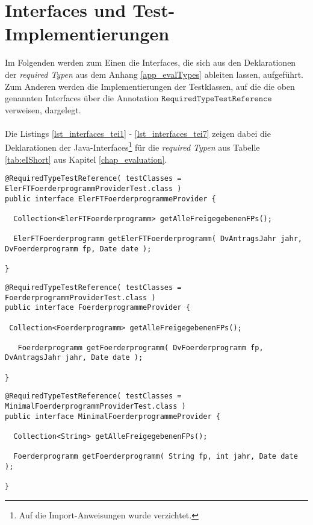 \chapter{Interfaces und Test-Implementierungen}\label{app_interfacesAndTests}
Im Folgenden werden zum Einen die Interfaces, die sich aus den Deklarationen der \emph{required Typen} aus dem Anhang \ref{app_evalTypes} ableiten lassen, aufgeführt. Zum Anderen werden die Implementierungen der Testklassen, auf die die oben genannten Interfaces über die Annotation $\texttt{RequiredTypeTestReference}$ verweisen, dargelegt. 
\\\\
Die Listings \ref{lst_interfaces_tei1} - \ref{lst_interfaces_tei7} zeigen dabei die Deklarationen der Java-Interfaces\footnote{Auf die Import-Anweisungen wurde verzichtet.} für die \emph{required Typen} aus Tabelle \ref{tab:eIShort} aus Kapitel \ref{chap_evaluation}.
\begin{lstlisting}[style = java, caption = Interface ElerFTFoerderprogrammeProvider, captionpos = b, label = lst_interfaces_tei1]
@RequiredTypeTestReference( testClasses = ElerFTFoerderprogrammProviderTest.class )
public interface ElerFTFoerderprogrammeProvider {

  Collection<ElerFTFoerderprogramm> getAlleFreigegebenenFPs();

  ElerFTFoerderprogramm getElerFTFoerderprogramm( DvAntragsJahr jahr, DvFoerderprogramm fp, Date date );
  
}
\end{lstlisting}
\begin{lstlisting}[style = java, caption = Interface FoerderprogrammeProvider, captionpos = b, label = lst_interfaces_tei2]
@RequiredTypeTestReference( testClasses = FoerderprogrammProviderTest.class )
public interface FoerderprogrammeProvider {

 Collection<Foerderprogramm> getAlleFreigegebenenFPs();

   Foerderprogramm getFoerderprogramm( DvFoerderprogramm fp, DvAntragsJahr jahr, Date date );
   
}
\end{lstlisting}
\begin{lstlisting}[style = java, caption = Interface MinimalFoerderprogrammeProvider, captionpos = b, label = lst_interfaces_tei3]
@RequiredTypeTestReference( testClasses = MinimalFoerderprogrammProviderTest.class )
public interface MinimalFoerderprogrammeProvider {

  Collection<String> getAlleFreigegebenenFPs();

  Foerderprogramm getFoerderprogramm( String fp, int jahr, Date date );
  
}
\end{lstlisting}
